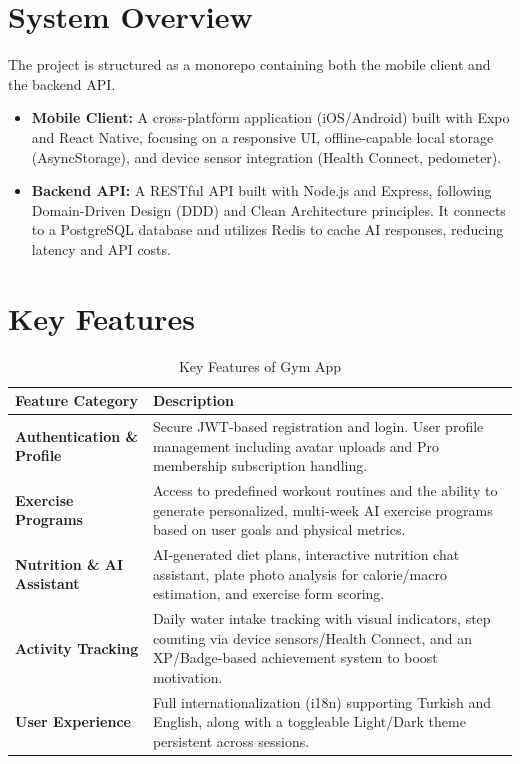 \documentclass[12pt,a4paper]{article}
\begin{document}
\section{System Overview}
The project is structured as a monorepo containing both the mobile client and the backend API. 
\begin{itemize}
    \item \textbf{Mobile Client:} A cross-platform application (iOS/Android) built with Expo and React Native, focusing on a responsive UI, offline-capable local storage (AsyncStorage), and device sensor integration (Health Connect, pedometer).
    \item \textbf{Backend API:} A RESTful API built with Node.js and Express, following Domain-Driven Design (DDD) and Clean Architecture principles. It connects to a PostgreSQL database and utilizes Redis to cache AI responses, reducing latency and API costs.
\end{itemize}

\section{Key Features}

\begin{table}[H]
\centering
\begin{tabular}{@{}p{4cm} p{11cm}@{}}
\toprule
\textbf{Feature Category} & \textbf{Description} \\ \midrule
\textbf{Authentication \& Profile} & Secure JWT-based registration and login. User profile management including avatar uploads and Pro membership subscription handling. \\ \addlinespace
\textbf{Exercise Programs} & Access to predefined workout routines and the ability to generate personalized, multi-week AI exercise programs based on user goals and physical metrics. \\ \addlinespace
\textbf{Nutrition \& AI Assistant} & AI-generated diet plans, interactive nutrition chat assistant, plate photo analysis for calorie/macro estimation, and exercise form scoring. \\ \addlinespace
\textbf{Activity Tracking} & Daily water intake tracking with visual indicators, step counting via device sensors/Health Connect, and an XP/Badge-based achievement system to boost motivation. \\ \addlinespace
\textbf{User Experience} & Full internationalization (i18n) supporting Turkish and English, along with a toggleable Light/Dark theme persistent across sessions. \\ \bottomrule
\end{tabular}
\caption{Key Features of Gym App}
\end{table}
\end{document}
